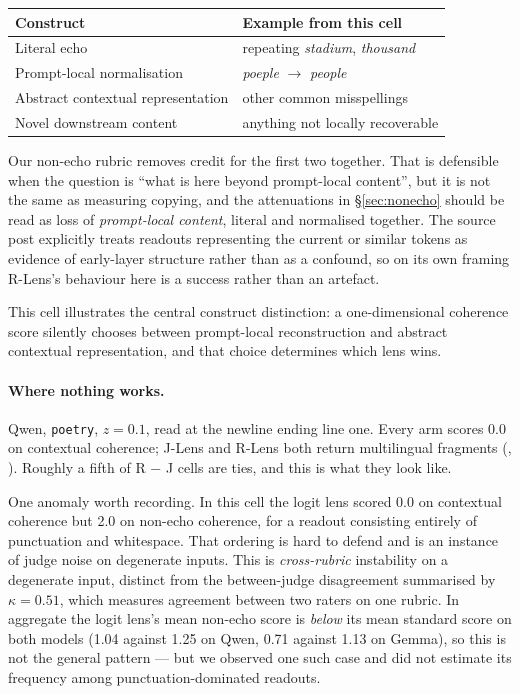 \documentclass[11pt]{article}
\newcommand{\flag}[1]{\textcolor{flagged}{#1}}
\begin{document}
\begin{center}\small
\begin{tabular}{ll}
\toprule
Construct & Example from this cell \\
\midrule
Literal echo & repeating \emph{stadium}, \emph{thousand} \\
Prompt-local normalisation & \emph{poeple} $\to$ \emph{people} \\
Abstract contextual representation & other common misspellings \\
Novel downstream content & anything not locally recoverable \\
\bottomrule
\end{tabular}
\end{center}

\flag{Our non-echo rubric removes credit for the first two together.} That is
defensible when the question is ``what is here beyond prompt-local content'',
but it is not the same as measuring copying, and the attenuations in
\S\ref{sec:nonecho} should be read as loss of \emph{prompt-local content},
literal and normalised together. The source post explicitly treats readouts
representing the current or similar tokens as evidence of early-layer structure
rather than as a confound, so on its own framing R-Lens's behaviour here is a
success rather than an artefact.

This cell illustrates the central construct distinction: a one-dimensional
coherence score silently chooses between prompt-local reconstruction and
abstract contextual representation, and that choice determines which lens wins.

\paragraph{Where nothing works.} Qwen, \texttt{poetry}, $z = 0.1$, read at the
newline ending line one. Every arm scores 0.0 on contextual coherence; J-Lens
and R-Lens both return multilingual fragments (,
). Roughly a fifth of R $-$ J cells are ties, and this
is what they look like.

\flag{One anomaly worth recording.} In this cell the logit lens scored 0.0 on
contextual coherence but 2.0 on non-echo coherence, for a readout consisting
entirely of punctuation and whitespace. That ordering is hard to defend and is
an instance of judge noise on degenerate inputs. This is \emph{cross-rubric} instability on a
degenerate input, distinct from the between-judge disagreement summarised by
$\kappa = 0.51$, which measures agreement between two raters on one rubric. In
aggregate the logit lens's mean non-echo score is \emph{below} its mean standard
score on both models (1.04 against 1.25 on Qwen, 0.71 against 1.13 on Gemma), so
this is not the general pattern --- but we observed one such case and did not
estimate its frequency among punctuation-dominated readouts.
\end{document}
